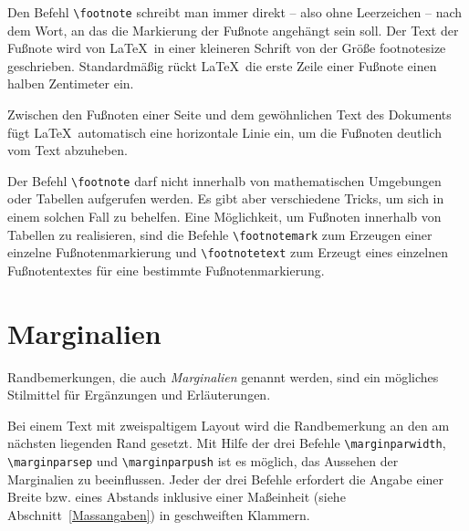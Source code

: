 \documentclass[a4paper,10pt,twoside]{scrbook}
\begin{document}
Den Befehl \verb!\footnote! schreibt man immer direkt -- also ohne
Leerzeichen -- nach dem Wort, an das die Markierung der Fußnote angehängt sein soll. Der
Text der Fußnote wird von \LaTeX\ in einer kleineren Schrift von der Größe  
{\footnotesize footnotesize} geschrieben. 
Standardmäßig rückt \LaTeX\ die erste
Zeile einer Fußnote einen halben Zentimeter ein. 

Zwischen den
Fußnoten einer Seite und dem gewöhnlichen 
Text des Dokuments fügt \LaTeX\ automatisch eine
horizontale Linie ein, um die Fußnoten deutlich vom Text abzuheben. 

Der Befehl \verb!\footnote! darf nicht innerhalb von mathematischen 
Umgebungen oder Tabellen aufgerufen werden. Es gibt aber verschiedene Tricks, um sich in einem solchen Fall zu behelfen. Eine Möglichkeit, um Fußnoten innerhalb von Tabellen zu realisieren, sind die Befehle \verb!\footnotemark! 
zum Erzeugen einer einzelne Fußnotenmarkierung und \verb!\footnotetext! 
zum Erzeugt eines einzelnen Fußnotentextes für eine bestimmte Fußnotenmarkierung.


\section{Marginalien}

Randbemerkungen, die auch \emph{Marginalien} genannt werden, 
sind ein mögliches Stilmittel für 
Ergänzungen und Erläuterungen.   







Bei einem Text mit zweispaltigem Layout wird die Randbemerkung an den am 
nächsten liegenden Rand gesetzt.
Mit Hilfe der drei Befehle \verb!\marginparwidth!, 
\verb!\marginparsep! und 
\verb!\marginparpush! ist es möglich, das Aussehen der Marginalien zu beeinflussen.
Jeder der drei Befehle erfordert die Angabe einer Breite bzw. eines Abstands inklusive einer Maßeinheit (siehe Abschnitt~\ref{Massangaben}) in geschweiften Klammern.
\end{document}
